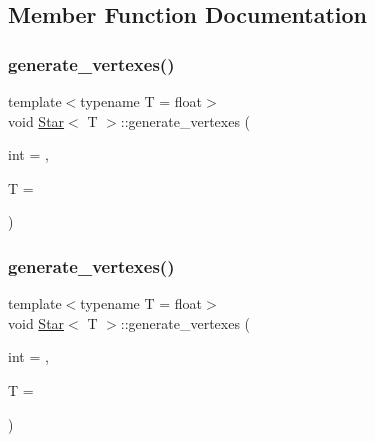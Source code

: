 \subsection{Member Function Documentation}
\mbox{\label{classStar_ac9ce42a8f7289484594f7f0ab5124849}} 
\subsubsection{\texorpdfstring{generate\+\_\+vertexes()}{generate\_vertexes()}\hspace{0.1cm}{\footnotesize\ttfamily [1/6]}}
{\footnotesize\ttfamily template$<$typename T  = float$>$ \\
void \mbox{\hyperlink{classStar}{Star}}$<$ T $>$\+::generate\+\_\+vertexes (\begin{DoxyParamCaption}\item[{int}]{ = {},  }\item[{T}]{ = {} }\end{DoxyParamCaption})\hspace{0.3cm}{\ttfamily [private]}}

\mbox{\label{classStar_ac9ce42a8f7289484594f7f0ab5124849}} 
\subsubsection{\texorpdfstring{generate\+\_\+vertexes()}{generate\_vertexes()}\hspace{0.1cm}{\footnotesize\ttfamily [2/6]}}
{\footnotesize\ttfamily template$<$typename T  = float$>$ \\
void \mbox{\hyperlink{classStar}{Star}}$<$ T $>$\+::generate\+\_\+vertexes (\begin{DoxyParamCaption}\item[{int}]{ = {},  }\item[{T}]{ = {} }\end{DoxyParamCaption})\hspace{0.3cm}{\ttfamily [private]}}

\mbox{\label{classStar_ab46cbc7aca971bc1c07b8d4afe8fba37}} 
